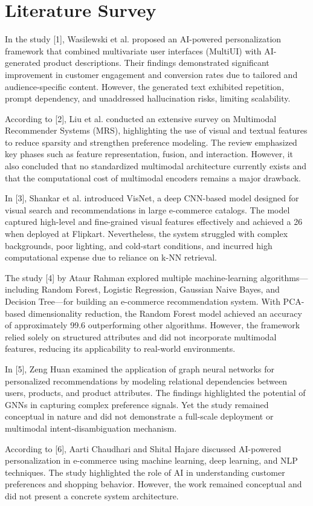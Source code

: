 \documentclass[conference]{IEEEtran}
\begin{document}
\section{Literature Survey}In the study [1], Wasilewski et al. proposed an
AI-powered personalization framework that combined
multivariate user interfaces (MultiUI) with AI-generated
product descriptions. Their findings demonstrated
significant improvement in customer engagement and
conversion rates due to tailored and audience-specific
content. However, the generated text exhibited
repetition, prompt dependency, and unaddressed
hallucination risks, limiting scalability. \par
According to [2], Liu et al. conducted an extensive
survey on Multimodal Recommender Systems (MRS),
highlighting the use of visual and textual features to
reduce sparsity and strengthen preference modeling. The
review emphasized key phases such as feature
representation, fusion, and interaction. However, it also
concluded that no standardized multimodal architecture
currently exists and that the computational cost of
multimodal encoders remains a major drawback. \par
In [3], Shankar et al. introduced VisNet, a deep
CNN-based model designed for visual search and
recommendations in large e-commerce catalogs. The
model captured high-level and fine-grained visual
features effectively and achieved a 26%
when deployed at Flipkart. Nevertheless, the system
struggled with complex backgrounds, poor lighting, and
cold-start conditions, and incurred high computational
expense due to reliance on k-NN retrieval. \par
The study [4] by Ataur Rahman explored multiple
machine-learning algorithms—including Random Forest,
Logistic Regression, Gaussian Naive Bayes, and
Decision Tree—for building an e-commerce
recommendation system. With PCA-based
dimensionality reduction, the Random Forest model
achieved an accuracy of approximately 99.6%
outperforming other algorithms. However, the
framework relied solely on structured attributes and did
not incorporate multimodal features, reducing its
applicability to real-world environments. \par
In [5], Zeng Huan examined the application of graph
neural networks for personalized recommendations by
modeling relational dependencies between users,
products, and product attributes. The findings
highlighted the potential of GNNs in capturing complex
preference signals. Yet the study remained conceptual in
nature and did not demonstrate a full-scale deployment
or multimodal intent-disambiguation mechanism. \par
According to [6], Aarti Chaudhari and Shital Hajare discussed AI-powered personalization in e-commerce using machine learning, deep learning, and NLP techniques. The study highlighted the role of AI in understanding customer preferences and shopping behavior. However, the work remained conceptual and did not present a concrete system architecture. \par
\end{document}
